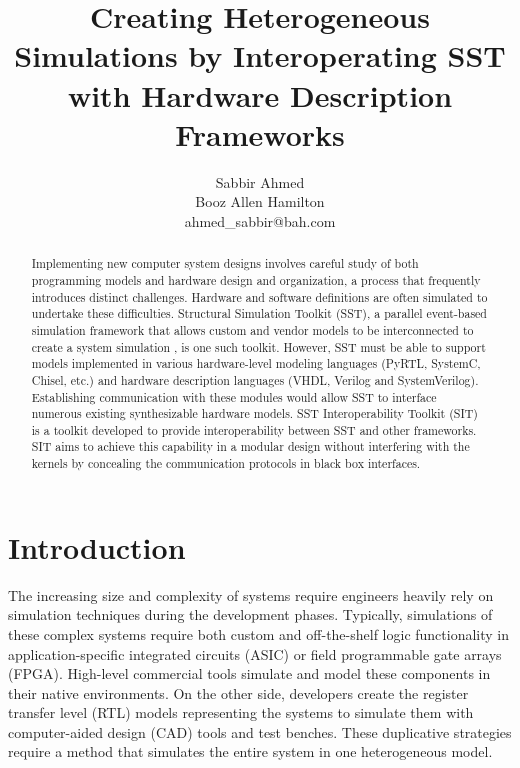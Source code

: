 \documentclass{article}
\title{Creating Heterogeneous Simulations by Interoperating SST with Hardware Description Frameworks}
\author{
  Sabbir Ahmed \\
  Booz Allen Hamilton \\
  ahmed\_sabbir@bah.com
}
\begin{document}
  \maketitle

  \begin{abstract}
    Implementing new computer system designs involves careful study of both programming models and
    hardware design and organization, a process that frequently introduces distinct challenges.
    Hardware and software definitions are often simulated to undertake these difficulties.
    Structural Simulation Toolkit (SST), a parallel event-based simulation framework that allows
    custom and vendor models to be interconnected to create a system simulation \cite{sst}, is one
    such toolkit. However, SST must be able to support models implemented in various hardware-level
    modeling languages (PyRTL, SystemC, Chisel, etc.) and hardware description languages (VHDL,
    Verilog and SystemVerilog). Establishing communication with these modules would allow SST to
    interface numerous existing synthesizable hardware models. SST Interoperability Toolkit (SIT) is
    a toolkit developed to provide interoperability between SST and other frameworks. SIT aims to
    achieve this capability in a modular design without interfering with the kernels by concealing
    the communication protocols in black box interfaces.
  \end{abstract}

  \section{Introduction}  
  The increasing size and complexity of systems require engineers heavily rely on simulation
  techniques during the development phases. Typically, simulations of these complex systems require
  both custom and off-the-shelf logic functionality in application-specific integrated circuits
  (ASIC) or field programmable gate arrays (FPGA). High-level commercial tools simulate and model
  these components in their native environments. On the other side, developers create the register
  transfer level (RTL) models representing the systems to simulate them with computer-aided design
  (CAD) tools and test benches. These duplicative strategies require a method that simulates the
  entire system in one heterogeneous model.
\end{document}

